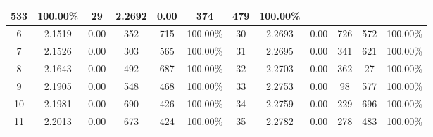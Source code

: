 \begin{table}[htbp]
\begin{minipage}[b]{0.45\linewidth}
{\begin{tabular}{cccccccccccc}
  \multicolumn{1}{c|}{533} &
  \multicolumn{1}{c|}{100.00\%} &
  \multicolumn{1}{c|}{29} &
  \multicolumn{1}{c|}{2.2692} &
  \multicolumn{1}{c|}{0.00} &
  \multicolumn{1}{c|}{374} &
  \multicolumn{1}{c|}{479} &
  100.00\% \\ \hline
\multicolumn{1}{c|}{6} &
  \multicolumn{1}{c|}{2.1519} &
  \multicolumn{1}{c|}{0.00} &
  \multicolumn{1}{c|}{352} &
  \multicolumn{1}{c|}{715} &
  \multicolumn{1}{c|}{100.00\%} &
  \multicolumn{1}{c|}{30} &
  \multicolumn{1}{c|}{2.2693} &
  \multicolumn{1}{c|}{0.00} &
  \multicolumn{1}{c|}{726} &
  \multicolumn{1}{c|}{572} &
  100.00\% \\ \hline
\multicolumn{1}{c|}{7} &
  \multicolumn{1}{c|}{2.1526} &
  \multicolumn{1}{c|}{0.00} &
  \multicolumn{1}{c|}{303} &
  \multicolumn{1}{c|}{565} &
  \multicolumn{1}{c|}{100.00\%} &
  \multicolumn{1}{c|}{31} &
  \multicolumn{1}{c|}{2.2695} &
  \multicolumn{1}{c|}{0.00} &
  \multicolumn{1}{c|}{341} &
  \multicolumn{1}{c|}{621} &
  100.00\% \\ \hline
\multicolumn{1}{c|}{8} &
  \multicolumn{1}{c|}{2.1643} &
  \multicolumn{1}{c|}{0.00} &
  \multicolumn{1}{c|}{492} &
  \multicolumn{1}{c|}{687} &
  \multicolumn{1}{c|}{100.00\%} &
  \multicolumn{1}{c|}{32} &
  \multicolumn{1}{c|}{2.2703} &
  \multicolumn{1}{c|}{0.00} &
  \multicolumn{1}{c|}{362} &
  \multicolumn{1}{c|}{27} &
  100.00\% \\ \hline
\multicolumn{1}{c|}{9} &
  \multicolumn{1}{c|}{2.1905} &
  \multicolumn{1}{c|}{0.00} &
  \multicolumn{1}{c|}{548} &
  \multicolumn{1}{c|}{468} &
  \multicolumn{1}{c|}{100.00\%} &
  \multicolumn{1}{c|}{33} &
  \multicolumn{1}{c|}{2.2753} &
  \multicolumn{1}{c|}{0.00} &
  \multicolumn{1}{c|}{98} &
  \multicolumn{1}{c|}{577} &
  100.00\% \\ \hline
\multicolumn{1}{c|}{10} &
  \multicolumn{1}{c|}{2.1981} &
  \multicolumn{1}{c|}{0.00} &
  \multicolumn{1}{c|}{690} &
  \multicolumn{1}{c|}{426} &
  \multicolumn{1}{c|}{100.00\%} &
  \multicolumn{1}{c|}{34} &
  \multicolumn{1}{c|}{2.2759} &
  \multicolumn{1}{c|}{0.00} &
  \multicolumn{1}{c|}{229} &
  \multicolumn{1}{c|}{696} &
  100.00\% \\ \hline
\multicolumn{1}{c|}{11} &
  \multicolumn{1}{c|}{2.2013} &
  \multicolumn{1}{c|}{0.00} &
  \multicolumn{1}{c|}{673} &
  \multicolumn{1}{c|}{424} &
  \multicolumn{1}{c|}{100.00\%} &
  \multicolumn{1}{c|}{35} &
  \multicolumn{1}{c|}{2.2782} &
  \multicolumn{1}{c|}{0.00} &
  \multicolumn{1}{c|}{278} &
  \multicolumn{1}{c|}{483} &
  100.00\% \\ \hline

\end{tabular}}
\end{minipage}
\end{table}
